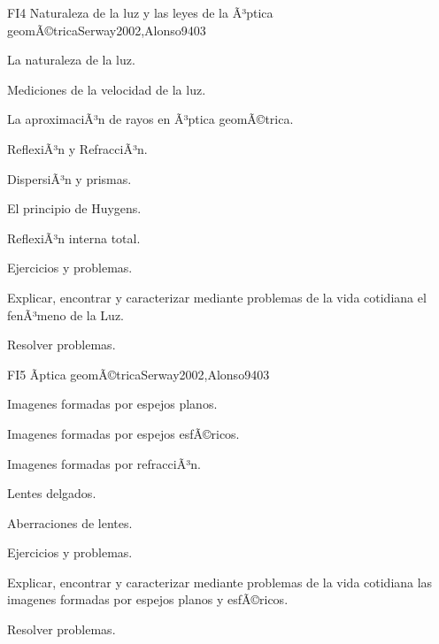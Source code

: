 \begin{syllabus}
\begin{unit}{FI4 Naturaleza de la luz y las leyes de la Ã³ptica geomÃ©trica}{Serway2002,Alonso94}{0}{3}
\begin{topics}
      \item La naturaleza de la luz.
        \item Mediciones de la velocidad de la luz.
        \item La aproximaciÃ³n de rayos en Ã³ptica geomÃ©trica.
        \item ReflexiÃ³n y RefracciÃ³n.
        \item DispersiÃ³n y prismas.
        \item El principio de Huygens.
        \item ReflexiÃ³n interna total.
        \item Ejercicios y problemas.
   \end{topics}

   \begin{unitgoals}
      \item Explicar, encontrar y caracterizar mediante problemas de la vida cotidiana el fenÃ³meno de la Luz.
      \item Resolver problemas.
      \end{unitgoals}
\end{unit}

\begin{unit}{FI5 Ãptica geomÃ©trica}{Serway2002,Alonso94}{0}{3}
\begin{topics}
      \item Imagenes formadas por espejos planos.
        \item Imagenes formadas por espejos esfÃ©ricos.
        \item Imagenes formadas por refracciÃ³n.
        \item Lentes delgados.
        \item Aberraciones de lentes.
        \item Ejercicios y problemas.
      \end{topics}

   \begin{unitgoals}
      \item Explicar, encontrar y caracterizar mediante problemas de la vida cotidiana las imagenes formadas por espejos planos y esfÃ©ricos.
      \item Resolver problemas.
   \end{unitgoals}
\end{unit}


\end{syllabus}
